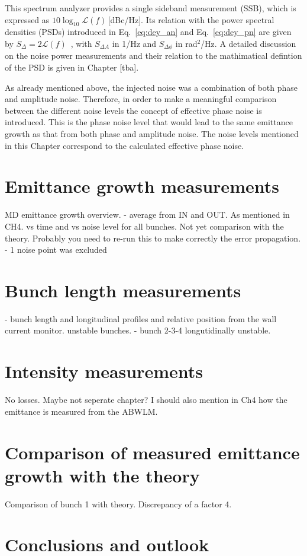 \begin{sloppypar} %
This spectrum analyzer provides a single sideband measurement (SSB), which is expressed as $10\log_{10}\mathcal{L}(f)$\,[dBc/Hz]. Its relation with the power spectral densities (PSDs) introduced in Eq.~\eqref{eq:dey_an} and Eq.~\eqref{eq:dey_pn} are given by $S_\Delta = 2\mathcal{L}(f)$~\cite{IEEE:4797525}, with $S_{\Delta A}$ in 1/Hz and $S_{\Delta\phi}$ in rad$^2$/Hz. A detailed discussion on the noise power measurements and their relation to the mathimatical defintion of the PSD is given in Chapter [tba].

As already mentioned above, the injected noise was a combination of both phase and amplitude noise. Therefore, in order to make a meaningful comparison between the different noise levels the concept of effective phase noise is introduced. This is the phase noise level that would lead to
the same emittance growth as that from both phase and
amplitude noise. The noise levels mentioned in this Chapter correspond to the calculated effective phase noise.
\end{sloppypar} 

\section{Emittance growth measurements}\label{sec:EmitGrowth_measurements}


MD emittance growth overview. 
    - average from IN and OUT. As mentioned in CH4. vs time and vs noise level for all bunches. Not yet comparison with the theory. Probably you need to re-run this to make correctly the error propagation. 
    - 1 noise point was excluded
 


\section{Bunch length measurements}\label{sec:bunch_length_measurements_2018}
    - bunch length and longitudinal profiles and relative position from the wall current monitor.  unstable bunches.
    - bunch 2-3-4 longutidinally unstable.
 
\section{Intensity measurements}\label{sec:intensity_measurements_2018}
No losses. Maybe not seperate chapter?
I should also mention in Ch4 how the emittance is measured from the ABWLM.

\section{Comparison of measured emittance growth with the theory}\label{sec:meas_2018_vs_theory}

Comparison of bunch 1 with theory. Discrepancy of a factor 4.


 \section{Conclusions and outlook}\label{sec:MD2018_summary}
